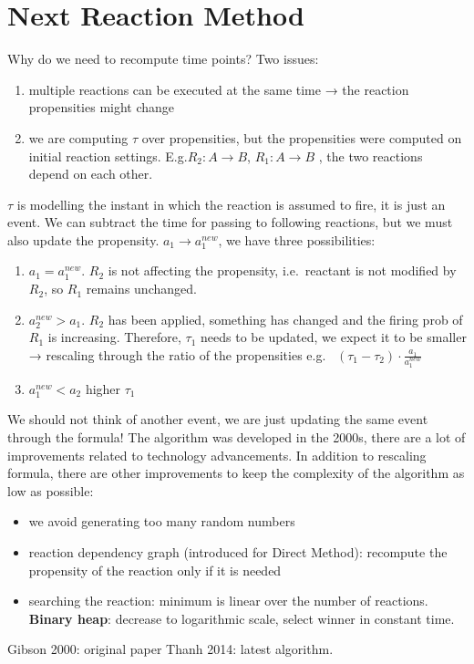 \section{Next Reaction Method}
Why do we need to recompute time points? Two issues:

\begin{enumerate}
  \def\labelenumi{\arabic{enumi}.}
  \item multiple reactions can be executed at the same time → the reaction propensities might change \item we are computing $\tau$ over propensities, but the propensities were computed on initial reaction settings.
  E.g.$R_2:A \rightarrow B$, $R_1 : A \rightarrow B$ , the two reactions depend on each other.
\end{enumerate}

\noindent
$\tau$ is modelling the instant in which the reaction is assumed to fire, it is just an event.
We can subtract the time for passing to following reactions, but we must also update the propensity.
$a_1 \rightarrow a_1^{new}$, we have three possibilities:

\begin{enumerate}
  \def\labelenumi{\arabic{enumi}.}
  \item $a_1 = a_1^{new}$. $R_2$ is not affecting the propensity, i.e.~reactant is not modified by $R_2$, so $R_1$ remains unchanged.
  \item $a_2^{new}> a_1$. $R_2$ has been applied, something has changed and the firing prob of $R_1$ is increasing.
    Therefore, $\tau_1$ needs to be updated, we expect it to be smaller → rescaling through the ratio of the propensities e.g. ~$(\tau_1-\tau_2) \cdot \frac{a_1}{a_1^{new}}$ \item $a_1^{new}< a_2$ higher $\tau_1$
\end{enumerate}
\noindent
We should not think of another event, we are just updating the same event through the formula! The algorithm was developed in the 2000s, there are a lot of improvements related to technology advancements.
In addition to rescaling formula, there are other improvements to keep the complexity of the algorithm as low as possible:

\begin{itemize}
  \item we avoid generating too many random numbers
  \item reaction dependency graph (introduced for Direct Method): recompute the propensity of the reaction only if it is needed
  \item searching the reaction: minimum is linear over the number of reactions.
    \textbf{Binary heap}: decrease to logarithmic scale, select winner in constant time.
\end{itemize}
\noindent
Gibson 2000: original paper Thanh 2014: latest algorithm.

